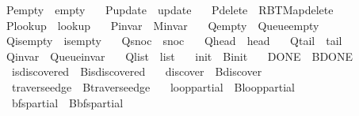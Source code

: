 \begin{isabellebody}
\ \ P{\isacharunderscore}{\kern0pt}empty\ {\isacharequal}{\kern0pt}\ empty\ \isanewline
\ \ P{\isacharunderscore}{\kern0pt}update\ {\isacharequal}{\kern0pt}\ update\ \isanewline
\ \ P{\isacharunderscore}{\kern0pt}delete\ {\isacharequal}{\kern0pt}\ RBT{\isacharunderscore}{\kern0pt}Map{\isachardot}{\kern0pt}delete\ \isanewline
\ \ P{\isacharunderscore}{\kern0pt}lookup\ {\isacharequal}{\kern0pt}\ lookup\ \isanewline
\ \ P{\isacharunderscore}{\kern0pt}invar\ {\isacharequal}{\kern0pt}\ M{\isachardot}{\kern0pt}invar\ \isanewline
\ \ Q{\isacharunderscore}{\kern0pt}empty\ {\isacharequal}{\kern0pt}\ Queue{\isachardot}{\kern0pt}empty\ \isanewline
\ \ Q{\isacharunderscore}{\kern0pt}is{\isacharunderscore}{\kern0pt}empty\ {\isacharequal}{\kern0pt}\ is{\isacharunderscore}{\kern0pt}empty\ \isanewline
\ \ Q{\isacharunderscore}{\kern0pt}snoc\ {\isacharequal}{\kern0pt}\ snoc\ \isanewline
\ \ Q{\isacharunderscore}{\kern0pt}head\ {\isacharequal}{\kern0pt}\ head\ \isanewline
\ \ Q{\isacharunderscore}{\kern0pt}tail\ {\isacharequal}{\kern0pt}\ tail\ \isanewline
\ \ Q{\isacharunderscore}{\kern0pt}invar\ {\isacharequal}{\kern0pt}\ Queue{\isachardot}{\kern0pt}invar\ \isanewline
\ \ Q{\isacharunderscore}{\kern0pt}list\ {\isacharequal}{\kern0pt}\ list\isanewline
\ \ \ init\ {\isacharequal}{\kern0pt}\ B{\isachardot}{\kern0pt}init\isanewline
\ \ \ DONE\ {\isacharequal}{\kern0pt}\ B{\isachardot}{\kern0pt}DONE\isanewline
\ \ \ is{\isacharunderscore}{\kern0pt}discovered\ {\isacharequal}{\kern0pt}\ B{\isachardot}{\kern0pt}is{\isacharunderscore}{\kern0pt}discovered\isanewline
\ \ \ discover\ {\isacharequal}{\kern0pt}\ B{\isachardot}{\kern0pt}discover\isanewline
\ \ \ traverse{\isacharunderscore}{\kern0pt}edge\ {\isacharequal}{\kern0pt}\ B{\isachardot}{\kern0pt}traverse{\isacharunderscore}{\kern0pt}edge\isanewline
\ \ \ loop{\isacharunderscore}{\kern0pt}partial\ {\isacharequal}{\kern0pt}\ B{\isachardot}{\kern0pt}loop{\isacharunderscore}{\kern0pt}partial\isanewline
\ \ \ bfs{\isacharunderscore}{\kern0pt}partial\ {\isacharequal}{\kern0pt}\ B{\isachardot}{\kern0pt}bfs{\isacharunderscore}{\kern0pt}partial\isanewline
%
\isadelimproof
\ \ %
\endisadelimproof
%
\isatagproof
\isacommand{{\isachardot}{\kern0pt}{\isachardot}{\kern0pt}}\isamarkupfalse%
%
\endisatagproof
{\isafoldproof}%
%
\isadelimproof
\isanewline

\end{isabellebody}
